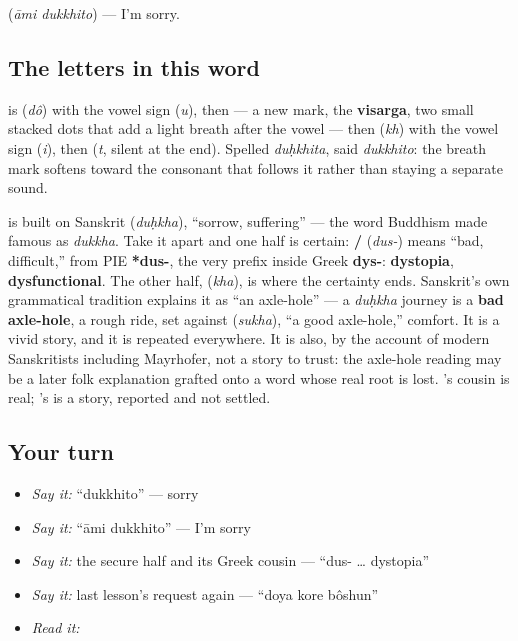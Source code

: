   (\emph{āmi dukkhito}) — I'm sorry.

\subsection*{The letters in this word}
\textbf{} is \textbf{} (\emph{dô}) with the vowel sign \textbf{} (\emph{u}), then \textbf{} — a new mark, the \textbf{visarga}, two small stacked dots that add a light breath after the vowel — then \textbf{} (\emph{kh}) with the vowel sign \textbf{} (\emph{i}), then \textbf{} (\emph{t}, silent at the end). Spelled \emph{duḥkhita}, said \emph{dukkhito}: the breath mark softens toward the consonant that follows it rather than staying a separate sound.

\begin{cousinweb}
\textbf{} is built on Sanskrit \textbf{} (\emph{duḥkha}), \textquotedblleft{}sorrow, suffering\textquotedblright{} — the word Buddhism made famous as \emph{dukkha}. Take it apart and one half is certain: \textbf{/} (\emph{dus-}) means \textquotedblleft{}bad, difficult,\textquotedblright{} from PIE \textbf{*dus-}, the very prefix inside Greek \textbf{dys-}: \textbf{dystopia}, \textbf{dysfunctional}. The other half, \textbf{} (\emph{kha}), is where the certainty ends. Sanskrit's own grammatical tradition explains it as \textquotedblleft{}an axle-hole\textquotedblright{} — a \emph{duḥkha} journey is a \textbf{bad axle-hole}, a rough ride, set against \textbf{} (\emph{sukha}), \textquotedblleft{}a good axle-hole,\textquotedblright{} comfort. It is a vivid story, and it is repeated everywhere. It is also, by the account of modern Sanskritists including Mayrhofer, not a story to trust: the axle-hole reading may be a later folk explanation grafted onto a word whose real root is lost. 's cousin is real; 's is a story, reported and not settled.
\end{cousinweb}

\subsection*{Your turn}
\begin{itemize}
\raggedright
  \item \emph{Say it:} \textquotedblleft{}dukkhito\textquotedblright{} — sorry
  \item \emph{Say it:} \textquotedblleft{}āmi dukkhito\textquotedblright{} — I'm sorry
  \item \emph{Say it:} the secure half and its Greek cousin — \textquotedblleft{}dus- … dystopia\textquotedblright{}
  \item \emph{Say it:} last lesson's request again — \textquotedblleft{}doya kore bôshun\textquotedblright{}
  \item \emph{Read it:} \textbf{}
\end{itemize}

